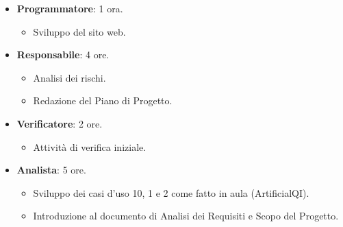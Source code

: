 \documentclass[a4paper, 12pt]{article}
\begin{document}
\begin{itemize}
\begin{itemize}
\begin{itemize}
            \end{itemize}
        \item \textbf{Programmatore}: 1 ora.
            \begin{itemize}
                \item Sviluppo del sito web.
            \end{itemize}
        \item \textbf{Responsabile}: 4 ore.
            \begin{itemize}
                \item Analisi dei rischi.
                \item Redazione del Piano di Progetto.
            \end{itemize}
        \item \textbf{Verificatore}: 2 ore.
            \begin{itemize}
                \item Attività di verifica iniziale.
            \end{itemize}
        \item \textbf{Analista}: 5 ore.
            \begin{itemize}
                \item Sviluppo dei casi d'uso 10, 1 e 2 come fatto in aula (ArtificialQI).
                \item Introduzione al documento di Analisi dei Requisiti e Scopo del Progetto.
            \end{itemize}
    \end{itemize}
\end{itemize}
\end{document}
